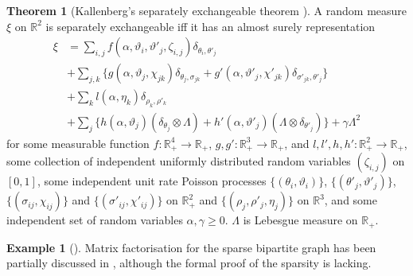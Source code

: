 \documentclass{article}
\theoremstyle{definition}
\newtheorem{example}{Example}[definition]
\newtheorem{theorem}[definition]{Theorem}
\begin{document}
\begin{theorem}[Kallenberg's separately exchangeable theorem \citep{Kallenberg1990}] A random measure $\xi$ on $\mathbb{R}^2$ is separately exchangeable iff it has an almost surely representation
\begin{align}
\xi &= \sum_{i,j} f(\alpha, \vartheta_i, \vartheta'_j, \zeta_{i,j})\delta_{\theta_i, \theta'_j} \\
&+ \sum_{j,k}\{g(\alpha, \vartheta_j, \chi_{jk})\delta_{\theta_j,\sigma_{jk}} + g'(\alpha, \vartheta'_j, \chi'_{jk})\delta_{\sigma'_{jk},\theta'_j}\}\\
&+ \sum_{k}l(\alpha, \eta_k)\delta_{\rho_k,\rho'_k} \\
&+\sum_j\{h(\alpha, \vartheta_j)(\delta_{\theta_j} \otimes \Lambda) + h'(\alpha, \vartheta'_j)(\Lambda \otimes \delta_{\theta'_j})\} + \gamma \Lambda^2
\end{align}
for some measurable function $f:\mathbb{R}_+^4 \rightarrow \mathbb{R}_+$, $g,g':\mathbb{R}_+^3 \rightarrow \mathbb{R}_+$, and $l, l', h, h': \mathbb{R}_+^2\rightarrow\mathbb{R}_+$, some collection of independent uniformly distributed random variables $(\zeta_{i,j})$ on $[0,1]$, some independent unit rate Poisson processes $\{(\theta_i, \vartheta_i)\}$, $\{(\theta'_j, \vartheta'_j)\}$, $\{(\sigma_{ij}, \chi_{ij})\}$ and $\{(\sigma'_{ij}, \chi'_{ij})\}$ on $\mathbb{R}_+^2$ and $\{(\rho_j, \rho'_j, \eta_j)\}$ on $\mathbb{R}^3$, and some independent set of random variables $\alpha, \gamma \geq 0$. $\Lambda$ is Lebesgue measure on $\mathbb{R}_+$.
\end{theorem}

\begin{example}[\citep{Caron2012}]
Matrix factorisation for the sparse bipartite graph has been partially discussed in \citep{Caron2012}, although the formal proof of the sparsity is lacking.
\end{example}



\end{document}
